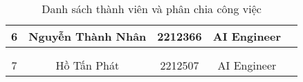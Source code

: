 \begin{table}[H]
\begin{tabular}{|c|c|c|c|p{4cm}|}
\multirow{-3}{*}{6} & \multirow{-3}{*}{Nguyễn Thành Nhân}       & \multirow{-3}{*}{2212366}         & \multirow{-3}{3cm}{\centering AI Engineer}                             &                                                                   \\ \hline
                    &                                           &                                   &                                                           &                                                                   \\ \cline{5-5} 
                    &                                           &                                   &                                                           &                                                                   \\ \cline{5-5}  
\multirow{-3}{*}{7} & \multirow{-3}{*}{Hồ Tấn Phát}             & \multirow{-3}{*}{2212507}         & \multirow{-3}{3cm}{\centering AI Engineer}                             &                                                                   \\ \hline
\end{tabular}
\caption{Danh sách thành viên và phân chia công việc}
\end{table}

\newpage